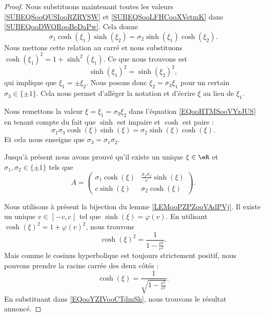 \begin{proof}
	Nous substituons maintenant toutes les valeurs \eqref{SUBEQSooQUSIooRZRYSW} et \eqref{SUBEQSooLFHCooXVetmK} dans \eqref{SUBEQooDWQRooBeDaPw}. Cela donne
	\begin{equation}            \label{EQooHTMSooVYzJUS}
		\sigma_1\cosh(\xi_1)\sinh(\xi_2)=\sigma_2\sinh(\xi_1)\cosh(\xi_2).
	\end{equation}
	Nous mettons cette relation au carré et nous substituons \( \cosh(\xi_1)^2=1+\sinh^2(\xi_1)\). Ce que nous trouvons est
	\begin{equation}
		\sinh(\xi_1)^2=\sinh(\xi_2)^2,
	\end{equation}
	qui implique que \( \xi_1=\pm\xi_2\). Nous posons donc \( \xi_2=\sigma_3\xi_1\) pour un certain \( \sigma_3\in \{ \pm 1 \}\). Cela nous permet d'alléger la notation et d'écrire \( \xi\) au lieu de \( \xi_1\).

	Nous remettons la valeur \( \xi=\xi_1=\sigma_3\xi_2\) dans l'équation \eqref{EQooHTMSooVYzJUS} en tenant compte du fait que \( \sinh\) est impaire et \( \cosh\) est paire :
	\begin{equation}
		\sigma_1\sigma_3\cosh(\xi)\sinh(\xi)=\sigma_2\sinh(\xi)\cosh(\xi).
	\end{equation}
	Et cela nous enseigne que \( \sigma_3=\sigma_1\sigma_2\).

	Jusqu'à présent nous avons prouvé qu'il existe un unique \( \xi\in \eR\) et \( \sigma_1,\sigma_2\in \{ \pm 1 \}\) tels que
	\begin{equation}        \label{EQooYZIVooCTdmSh}
		A=\begin{pmatrix}
			\sigma_1\cosh(\xi) & \frac{ \sigma_1\sigma_2 }{ c }\sinh(\xi) \\
			c\sinh(\xi)        & \sigma_2\cosh(\xi)
		\end{pmatrix}.
	\end{equation}

	Nous utilisons à présent la bijection du lemme \ref{LEMooPZPZooVAdPVj}. Il existe un unique \( v\in \mathopen] -c , c \mathclose[\) tel que \( \sinh(\xi)=\varphi(v)\). En utilisant \( \cosh(\xi)^2=1+\varphi(v)^2\), nous trouvons
	\begin{equation}
		\cosh(\xi)^2=\frac{1}{ 1-\frac{ v^2 }{ c^2 } }.
	\end{equation}
	Mais comme le cosinus hyperbolique est toujours strictement positif, nous pouvons prendre la racine carrée des deux côtés :
	\begin{equation}
		\cosh(\xi)=\frac{1}{ \sqrt{ 1-\frac{ v^2 }{ c^2 } } }.
	\end{equation}
	En substituant dans \eqref{EQooYZIVooCTdmSh}, nous trouvons le résultat annoncé.
\end{proof}

